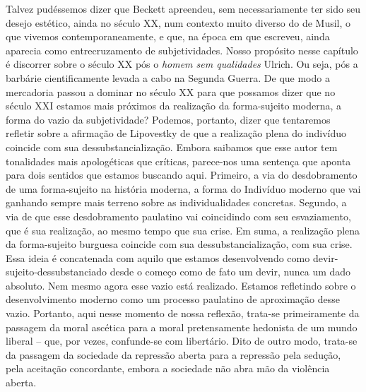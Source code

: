 Talvez pudéssemos dizer que Beckett apreendeu, sem necessariamente ter
sido seu desejo estético, ainda no século XX, num contexto muito diverso
do de Musil, o que vivemos contemporaneamente, e que, na época em que
escreveu, ainda aparecia como entrecruzamento de subjetividades. Nosso
propósito nesse capítulo é discorrer sobre o século XX pós o \emph{homem
sem qualidades} Ulrich. Ou seja, pós a barbárie cientificamente levada a
cabo na Segunda Guerra. De que modo a mercadoria passou a dominar no
século XX para que possamos dizer que no século XXI estamos mais
próximos da realização da forma-sujeito moderna, a forma do vazio da
subjetividade? Podemos, portanto, dizer que tentaremos refletir sobre a
afirmação de Lipovestky de que a realização plena do indivíduo coincide
com sua dessubstancialização. Embora saibamos que esse autor tem
tonalidades mais apologéticas que críticas, parece-nos uma sentença que
aponta para dois sentidos que estamos buscando aqui. Primeiro, a via do
desdobramento de uma forma-sujeito na história moderna, a forma do
Indivíduo moderno que vai ganhando sempre mais terreno sobre as
individualidades concretas. Segundo, a via de que esse desdobramento
paulatino vai coincidindo com seu esvaziamento, que é sua realização, ao
mesmo tempo que sua crise. Em suma, a realização plena da forma-sujeito
burguesa coincide com sua dessubstancialização, com sua crise. Essa
ideia é concatenada com aquilo que estamos desenvolvendo como
devir-sujeito-dessubstanciado desde o começo como de fato um devir,
nunca um dado absoluto. Nem mesmo agora esse vazio está realizado.
Estamos refletindo sobre o desenvolvimento moderno como um processo
paulatino de aproximação desse vazio. Portanto, aqui nesse momento de
nossa reflexão, trata-se primeiramente da passagem da moral ascética
para a moral pretensamente hedonista de um mundo liberal -- que, por
vezes, confunde-se com libertário. Dito de outro modo, trata-se da
passagem da sociedade da repressão aberta para a repressão pela sedução,
pela aceitação concordante, embora a sociedade não abra mão da violência
aberta.

